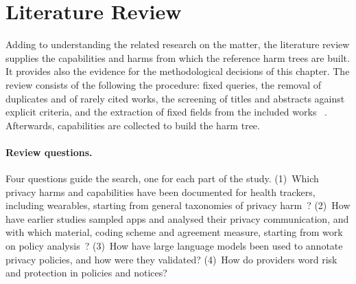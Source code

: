 \documentclass[twoside,its]{bossthesis}
\begin{document}
\section{Literature Review}
\label{sec:lit-review}
Adding to understanding the related research on the matter, the literature review
supplies the capabilities and harms from which the reference harm trees are
built. It provides also the evidence for the methodological decisions of this
chapter. The review consists of the following the procedure:
fixed queries, the removal of duplicates and of rarely cited works, the
screening of titles and abstracts against explicit criteria, and the extraction
of fixed fields from the included works ~\parencite[App.~A, pp.~56--57]{baumann2025llm}. Afterwards, capabilities are collected to build the harm tree.

\paragraph{Review questions.} Four questions guide the search, one for each part
of the study. (1)~Which privacy harms and capabilities have been documented for
health trackers, including wearables, starting from
general taxonomies of privacy harm~\parencite{solove2006taxonomy,calo2011boundaries}?
(2)~How have earlier studies sampled apps and analysed their privacy
communication, and with which material, coding scheme and agreement measure,
starting from work on policy analysis~\parencite{wilson2016creation,zimmeck2019maps}?
(3)~How have large language
models been used to annotate privacy policies, and how were they validated?
(4)~How do providers word risk and protection in policies and notices?
\end{document}
